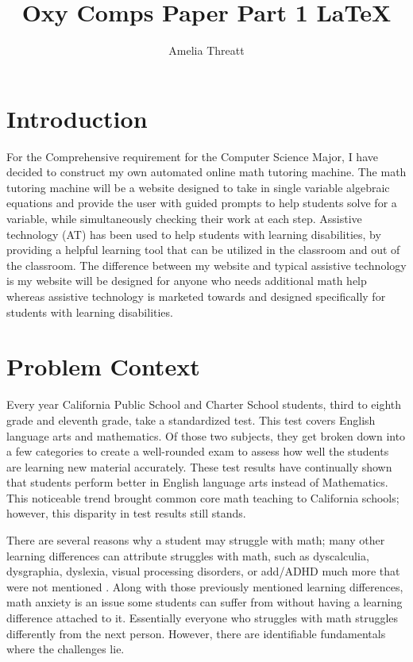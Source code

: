 \documentclass[10pt,twocolumn]{article}
\title{Oxy Comps Paper Part 1 \LaTeX}
\author{Amelia Threatt}
\affiliation{Occidental College}
\begin{document}
\maketitle
\section{Introduction}
For the Comprehensive requirement for the Computer Science Major, I have decided to construct my own automated online math tutoring machine. The math tutoring machine will be a website designed to take in single variable algebraic equations and provide the user with guided prompts to help students solve for a variable, while simultaneously checking their work at each step. Assistive technology (AT) has been used to help students with learning disabilities, by providing a helpful learning tool that can be utilized in the classroom and out of the classroom. The difference between my website and typical assistive technology is my website will be designed for anyone who needs additional math help whereas assistive technology is marketed towards and designed specifically for students with learning disabilities. 


\section{Problem Context}
Every year California Public School and Charter School students, third to eighth grade and eleventh grade, take a standardized test. This test covers English language arts and mathematics. Of those two subjects, they get broken down into a few categories to create a well-rounded exam to assess how well the students are learning new material accurately. These test results have continually shown that students perform better in English language arts instead of Mathematics. This noticeable trend brought common core math teaching to California schools; however, this disparity in test results still stands. \cite{noauthor_california_nodate}
 
There are several reasons why a student may struggle with math; many other learning differences can attribute struggles with math, such as dyscalculia, dysgraphia, dyslexia, visual processing disorders, or add/ADHD much more that were not mentioned \cite{noauthor_why_nodate}. Along with those previously mentioned learning differences, math anxiety is an issue some students can suffer from without having a learning difference attached to it. Essentially everyone who struggles with math struggles differently from the next person. However, there are identifiable fundamentals where the challenges lie.  
 
\end{document}
